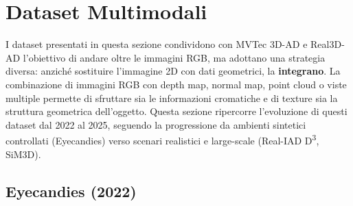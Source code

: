 \begin{table}[htbp]
\centering
\caption{Confronto tra i dataset 3D puri per anomaly detection industriale.}
\label{tab:confronto_3d}
\small
{}
\end{table}


\section{Dataset Multimodali}
\label{sec:dataset_multimodali}

I dataset presentati in questa sezione condividono con MVTec 3D-AD e Real3D-AD l'obiettivo di andare oltre le immagini RGB, ma adottano una strategia diversa: anziché sostituire l'immagine 2D con dati geometrici, la \textbf{integrano}. La combinazione di immagini RGB con depth map, normal map, point cloud o viste multiple permette di sfruttare sia le informazioni cromatiche e di texture sia la struttura geometrica dell'oggetto. Questa sezione ripercorre l'evoluzione di questi dataset dal 2022 al 2025, seguendo la progressione da ambienti sintetici controllati (Eyecandies) verso scenari realistici e large-scale (Real-IAD D\textsuperscript{3}, SiM3D).


\subsection{Eyecandies (2022)}
\label{sec:eyecandies}

